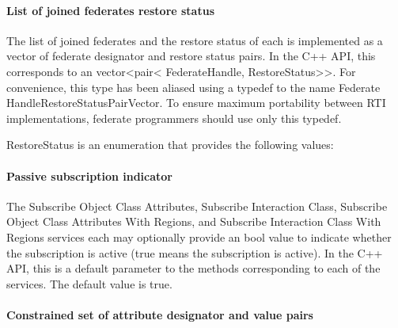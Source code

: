 \begin{compactstdpage}

    \paragraph{List of joined federates restore status}

    The list of joined federates and the restore status of each is implemented as a vector of federate designator and restore status pairs. In the C++ API, this corresponds to an vector\textless{}pair\textless{} FederateHandle, RestoreStatus\textgreater{}\textgreater{}. For convenience, this type has been aliased using a typedef to the name Federate HandleRestoreStatusPairVector. To ensure maximum portability between RTI implementations, federate programmers should use only this typedef.

    RestoreStatus is an enumeration that provides the following values:


    \paragraph{Passive subscription indicator}

    The Subscribe Object Class Attributes, Subscribe Interaction Class, Subscribe Object Class Attributes With Regions, and Subscribe Interaction Class With Regions services each may optionally provide an bool value to indicate whether the subscription is active (true means the subscription is active). In the C++ API, this is a default parameter to the methods corresponding to each of the services. The default value is true.

    \paragraph{Constrained set of attribute designator and value pairs}


\end{compactstdpage}
